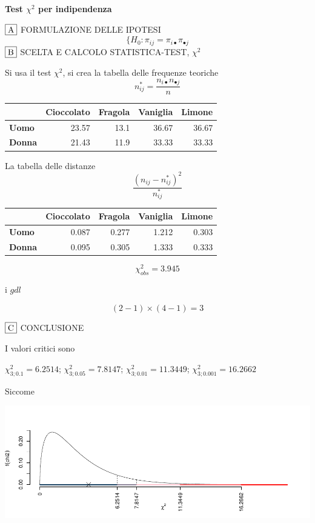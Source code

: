 \documentclass[
  11pt,
]{book}
\theoremstyle{mytheoremstyle}
\theoremstyle{mydefstyle}
\newenvironment{sol}
  {
  \begin{tcolorbox}[enhanced,breakable,arc=0.1mm,boxrule=1pt,colback=white,colframe=iblue,
  title=\bf \fontfamily{lmss}\selectfont \hspace{.5 cm} Soluzione,drop fuzzy shadow]

}{
\end{tcolorbox}
  }
\begin{document}
\begin{sol}
\textbf{Test \(\chi^2\) per indipendenza}

\(\fbox{A}\) FORMULAZIONE DELLE IPOTESI
\[
\Big\{H_0:\pi_{ij}=\pi_{i\bullet}\pi_{\bullet j}
\]
\(\fbox{B}\) SCELTA E CALCOLO STATISTICA-TEST, \(\chi^2\)

Si usa il test \(\chi^2\), si crea la tabella delle frequenze teoriche
\[
n_{ij}^*=\frac{n_{i\bullet}n_{\bullet j}}{n}
\]

\begin{table}[H]
\centering
\begin{tabular}{>{}lrrrr}
\toprule
  & Cioccolato & Fragola & Vaniglia & Limone\\
\midrule
\textbf{Uomo} & 23.57 & 13.1 & 36.67 & 36.67\\
\textbf{Donna} & 21.43 & 11.9 & 33.33 & 33.33\\
\bottomrule
\end{tabular}
\end{table}

La tabella delle distanze
\[
\frac{(n_{ij}-n_{ij}^*)^2}{n_{ij}^*}
\]

\begin{table}[H]
\centering
\begin{tabular}{>{}lrrrr}
\toprule
  & Cioccolato & Fragola & Vaniglia & Limone\\
\midrule
\textbf{Uomo} & 0.087 & 0.277 & 1.212 & 0.303\\
\textbf{Donna} & 0.095 & 0.305 & 1.333 & 0.333\\
\bottomrule
\end{tabular}
\end{table}

\[
    \chi^2_{obs}= 3.945 
  \]

i \(gdl\)

\[
    ( 2 -1)\times( 4 -1)= 3 
  \]

\(\fbox{C}\) CONCLUSIONE

I valori critici sono

\(\chi^2_{3;0.1}=6.2514\); \(\chi^2_{3;0.05}=7.8147\); \(\chi^2_{3;0.01}=11.3449\); \(\chi^2_{3;0.001}=16.2662\)

Siccome

\begin{center}\includegraphics{Esami_passati_con_soluzioni_files/figure-latex/05a-chi2-2-1} \end{center}


\end{sol}
\end{document}
